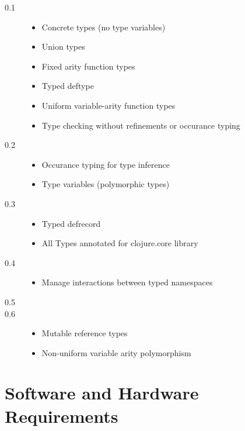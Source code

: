 \documentclass[12pt, a4paper]{article}
\begin{document}

\begin{description}
\item[0.1]
	\begin{itemize}
	\item Concrete types (no type variables)
	\item Union types
	\item Fixed arity function types
	\item Typed deftype
	\item Uniform variable-arity function types
	\item Type checking without refinements or occurance typing
	\end{itemize}
\item[0.2]
	\begin{itemize}
	\item Occurance typing for type inference
	\item Type variables (polymorphic types)
	\end{itemize}
\item[0.3]
	\begin{itemize}
	\item Typed defrecord
	\item All Types annotated for clojure.core library
	\end{itemize}
\item[0.4]
	\begin{itemize}
	\item Manage interactions between typed namespaces
	\end{itemize}
\item[0.5]
	\begin{itemize}
	\end{itemize}
\item[0.6]
	\begin{itemize}
	\item Mutable reference types
	\item Non-uniform variable arity polymorphism
	\end{itemize}

\end{description}
\section*{Software and Hardware Requirements}
\end{document}
